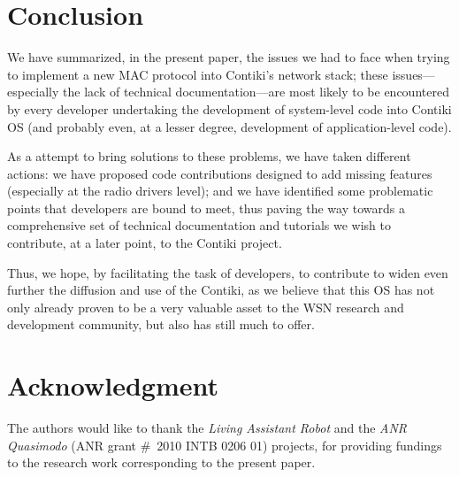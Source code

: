 \documentclass[12pt,twoside,a4paper]{article}
\begin{document}

\section{Conclusion}

We have summarized, in the present paper, the issues we had to face when
trying to implement a new MAC protocol into Contiki's network stack;
these issues---especially the lack of technical documentation---are
most likely to be encountered by every developer undertaking the
development of system-level code into Contiki OS (and probably
even, at a lesser degree, development of application-level code).

As a attempt to bring solutions to these problems, we have taken
different actions: we have proposed code contributions designed
to add missing features (especially at the radio drivers level);
and we have identified some problematic points that developers
are bound to meet, thus paving the way towards a comprehensive
set of technical documentation and tutorials we wish to contribute,
at a later point, to the Contiki project.

Thus, we hope, by facilitating the task of developers, to contribute
to widen even further the diffusion and use of the Contiki, as we
believe that this OS has not only already proven to be a very
valuable asset to the WSN research and development community, but also
has still much to offer.


\section*{Acknowledgment}

The authors would like to thank the \emph{Living Assistant Robot}
and the \emph{ANR Quasimodo} (ANR grant \#~2010 INTB 0206 01) projects,
for providing fundings to the research work corresponding
to the present paper.




{\small
}
\end{document}

